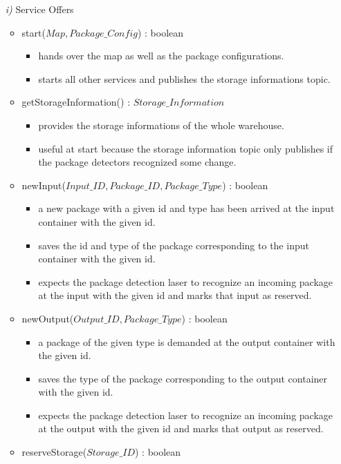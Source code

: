 \documentclass{article}
\begin{document}
\begin{enumerate}
	\item[\textit{i)}] Service Offers
	\begin{itemize}
		\item start($Map, Package\_Config$) : boolean
		\begin{itemize}
			\item  hands over the map as well as the package configurations.
			\item starts all other services and publishes the storage informations topic.
		\end{itemize}
		\item getStorageInformation() : $Storage\_Information$
		\begin{itemize}
			\item provides the storage informations of the whole warehouse.
			\item useful at start because the storage information topic only publishes if the package detectors
recognized some change.
		\end{itemize}
		\item newInput($Input\_ID, Package\_ID, Package\_Type$) : boolean
		\begin{itemize}
			\item  a new package with a given id and type has been arrived at the input container with the given id.
			\item saves the id and type of the package corresponding to the input container with the given id.
			\item expects the package detection laser to recognize an incoming package at the input with the given id and marks that input as reserved.
		\end{itemize}
		\item newOutput($Output\_ID, Package\_Type$) : boolean
		\begin{itemize}
			\item a package of the given type is demanded at the output container with the given id.
			\item saves the type of the package corresponding to the output container with the given id.
			\item  expects the package detection laser to recognize an incoming package at the output with the given id and marks that output as reserved.
		\end{itemize}
		\item reserveStorage($Storage\_ID$) : boolean
		\begin{itemize}

\end{itemize}
\end{itemize}
\end{enumerate}
\end{document}
